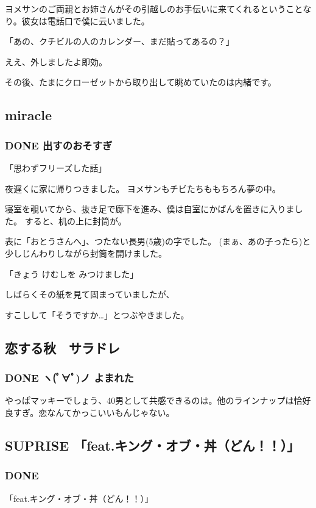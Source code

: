 \documentclass[11pt]{article}
\begin{document}
ヨメサンのご両親とお姉さんがその引越しのお手伝いに来てくれるということなり。彼女は電話口で僕に云いました。

「あの、クチビルの人のカレンダー、まだ貼ってあるの？」

ええ、外しましたよ即効。

その後、たまにクローゼットから取り出して眺めていたのは内緒です。
\subsection{miracle}
\label{sec-70_3}
\subsubsection{\textbf{DONE} 出すのおそすぎ}
\label{sec-70_3_1}

「思わずフリーズした話」

夜遅くに家に帰りつきました。
ヨメサンもチビたちももちろん夢の中。

寝室を覗いてから、抜き足で廊下を進み、僕は自室にかばんを置きに入りました。
すると、机の上に封筒が。

表に「おとうさんへ」、つたない長男(5歳)の字でした。
(まぁ、あの子ったら)と少しじんわりしながら封筒を開けました。

「きょう けむしを みつけました」

しばらくその紙を見て固まっていましたが、

すこしして「そうですか…」とつぶやきました。
\subsection{恋する秋　サラドレ}
\label{sec-70_4}
\subsubsection{\textbf{DONE} ヽ(ﾟ∀ﾟ)ノ よまれた}
\label{sec-70_4_1}

やっぱマッキーでしょう、40男として共感できるのは。他のラインナップは恰好良すぎ。恋なんてかっこいいもんじゃない。
\subsection{SUPRISE 「feat.キング・オブ・丼（どん！！）」}
\label{sec-70_5}
\subsubsection{\textbf{DONE}}
\label{sec-70_5_1}

「feat.キング・オブ・丼（どん！！）」
\end{document}

